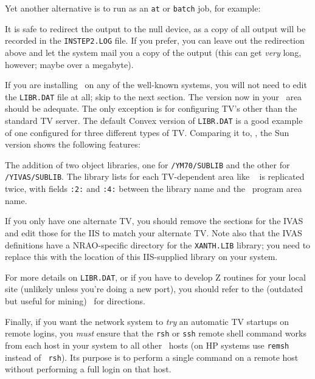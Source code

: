 Yet another alternative is to run as an {\tt at} or {\tt batch} job,
for example:\medskip

\medskip

\noindent It is safe to redirect the output to the null device, as a
copy of all output will be recorded in the {\tt INSTEP2.LOG} file.  If
you prefer, you can leave out the redirection above and let the system
mail you a copy of the output (this can get {\it very\/} long, however;
maybe over a megabyte).

\medskip{}

If you are installing \AIPS\ on any of the well-known systems, you will
not need to edit the {\tt LIBR.DAT} file at all; skip to the next
section.  The version now in your \SYSL\ area should be adequate.  The
only exception is for configuring TV's other than the standard TV
server.  The default Convex version of {\tt LIBR.DAT} is a good example
of one configured for three different types of TV.  Comparing it to,
\eg, the Sun version shows the following features:\medskip

{\ndot The addition of two object libraries, one for
       {\tt\LIBR/YM70/SUBLIB} and the other for
       {\tt\LIBR/YIVAS/SUBLIB}.}
{\ndot The library lists for each TV-dependent area like \AIPPGM\ %
       is replicated twice, with fields {\tt :2:} and {\tt :4:}
       between the library name and the \AIPS\ program area name.
       \medskip}\medskip

\noindent If you only have one alternate TV, you should remove the
sections for the IVAS and edit those for the IIS to match your
alternate TV.  Note also that the IVAS definitions have a
NRAO-specific directory for the {\tt XANTH.LIB} library; you need to
replace this with the location of this IIS-supplied library on your
system.

For more details on {\tt LIBR.DAT}, or if you have to develop Z routines
for your local site (unlikely unless you're doing a new port), you
should refer to the (outdated but useful for mining) \BOH\ for
directions.

\medskip{}

Finally, if you want the network system to {\it try\/} an automatic TV
startups on remote logins, you {\it must\/} ensure that the {\tt rsh} or
{\tt ssh} remote shell command works from each host in your system to
all other \AIPS\ hosts (on HP systems use {\tt remsh} instead of {\tt
rsh}).  Its purpose is to perform a single command on a remote host
without performing a full login on that host.

